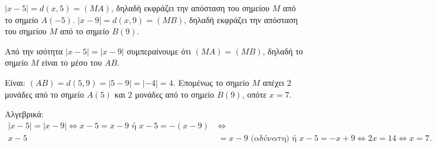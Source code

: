 
\begin{alist}
\item $|x - 5| = d(x, 5) = (MA)$, δηλαδή εκφράζει την απόσταση του σημείου $M$ από το σημείο $A(-5)$.
$|x - 9| = d(x, 9) = (MB)$, δηλαδή εκφράζει την απόσταση του σημείου $M$ από το σημείο $B(9)$.

\item
\begin{rlist}
\item Από την ισότητα $|x - 5| = |x - 9|$ συμπεραίνουμε ότι $(MA) = (MB)$, δηλαδή το σημείο $M$ είναι το μέσο του $AB$.
\item Είναι: $(AB) = d(5, 9) = |5 - 9| = |-4| = 4$.
Επομένως το σημείο $M$ απέχει $2$ μονάδες από το σημείο $A(5)$ και $2$ μονάδες από το σημείο $B(9)$, οπότε $x = 7$.

Αλγεβρικά:
\begin{align*}
|x - 5| = |x - 9| \Leftrightarrow x - 5 = x - 9 \text{ ή } x - 5 = -(x - 9) \ &\Leftrightarrow \\
x - 5 &= x - 9 \text{ (αδύνατη) ή } x - 5 = -x + 9 \Leftrightarrow 2x = 14 \Leftrightarrow x = 7.
\end{align*}
\end{rlist}
\end{alist}

